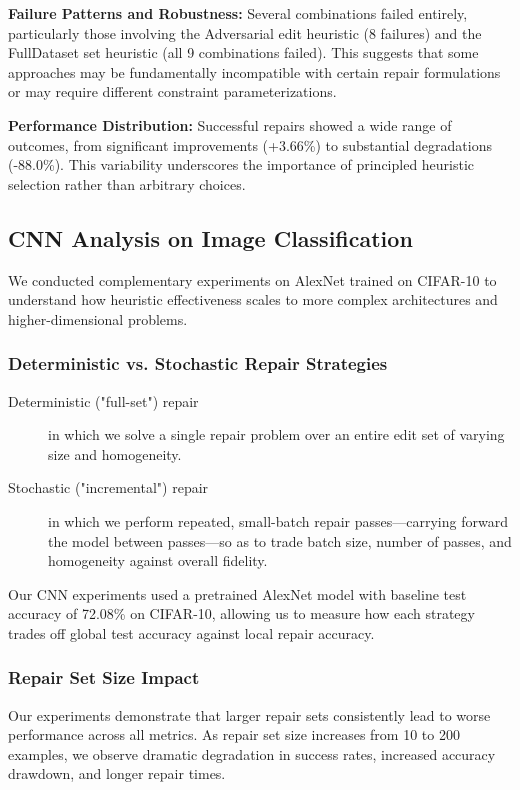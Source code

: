 \documentclass{article}
\begin{document}
\textbf{Failure Patterns and Robustness:} Several combinations failed entirely, particularly those involving the Adversarial edit heuristic (8 failures) and the FullDataset set heuristic (all 9 combinations failed). This suggests that some approaches may be fundamentally incompatible with certain repair formulations or may require different constraint parameterizations.

\textbf{Performance Distribution:} Successful repairs showed a wide range of outcomes, from significant improvements (+3.66\%) to substantial degradations (-88.0\%). This variability underscores the importance of principled heuristic selection rather than arbitrary choices.

\subsection{CNN Analysis on Image Classification}

We conducted complementary experiments on AlexNet trained on CIFAR-10 to understand how heuristic effectiveness scales to more complex architectures and higher-dimensional problems.

\subsubsection{Deterministic vs. Stochastic Repair Strategies}

\begin{description}
	\item[Deterministic ("full-set") repair] in which we solve a single repair problem over an entire edit set of varying size and homogeneity.
	\item[Stochastic ("incremental") repair] in which we perform repeated, small-batch repair passes—carrying forward the model between passes—so as to trade batch size, number of passes, and homogeneity against overall fidelity.
\end{description}

Our CNN experiments used a pretrained AlexNet model with baseline test accuracy of 72.08\% on CIFAR-10, allowing us to measure how each strategy trades off global test accuracy against local repair accuracy.

\subsubsection{Repair Set Size Impact}

Our experiments demonstrate that larger repair sets consistently lead to worse performance across all metrics. As repair set size increases from 10 to 200 examples, we observe dramatic degradation in success rates, increased accuracy drawdown, and longer repair times.
\end{document}
